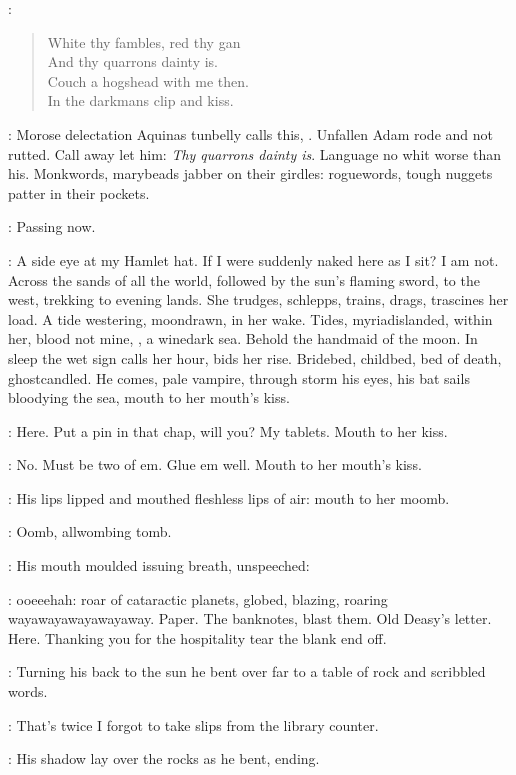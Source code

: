 :
\begin{verse}
    White thy fambles, red thy gan \\
    And thy quarrons dainty is. \\
    Couch a hogshead with me then. \\
    In the darkmans clip and kiss.
\end{verse}

\StephenInt:
Morose delectation Aquinas tunbelly calls this, .
Unfallen Adam rode and not rutted.
Call away let him:
\emph{Thy quarrons dainty is}.
Language no whit worse than his.
Monkwords, marybeads jabber on their girdles:
roguewords, tough nuggets patter in their pockets.

\StephenInt:
Passing now.

\StephenInt:
A side eye at my Hamlet hat.
If I were suddenly naked here as I sit?
I am not.
Across the sands of all the world,
followed by the sun's flaming sword,
to the west, trekking to evening lands.
She trudges, schlepps,
trains, drags, trascines her load.
A tide westering, moondrawn, in her wake.
Tides, myriadislanded, within her,
blood not mine,
,
a winedark sea.
Behold the handmaid of the moon.
In sleep the wet sign calls her hour, bids her rise.
Bridebed, childbed,
bed of death,
ghostcandled.
He comes, pale vampire, through storm
his eyes, his bat sails bloodying the sea,
mouth to her mouth's kiss.

\StephenInt:
Here.
Put a pin in that chap, will you?
My tablets.
Mouth to her kiss.

\StephenInt:
No.
Must be two of em.
Glue em well.
Mouth to her mouth's kiss.

:
His lips lipped and mouthed fleshless lips of air:
mouth to her moomb.

\StephenInt:
Oomb, allwombing tomb.

:
His mouth moulded issuing breath, unspeeched:

\StephenInt:
ooeeehah:
roar of cataractic planets, globed, blazing,
roaring wayawayawayawayaway.
Paper.
The banknotes, blast them.
Old Deasy's letter.
Here.
Thanking you for the hospitality tear the blank end off.

:
Turning his back to the sun
he bent over far to a table of rock and scribbled words.

\StephenInt:
That's twice I forgot to take slips from the library counter.

:
His shadow lay over the rocks as he bent, ending.

